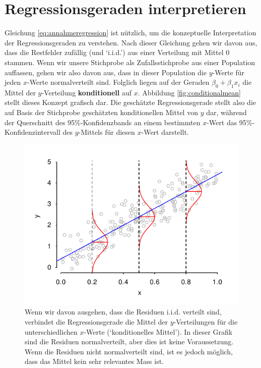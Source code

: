 \documentclass[oneside, 10pt]{book}\usepackage[]{graphicx}\usepackage[]{xcolor}
\newenvironment{knitrout}{}{} %
\begin{document}
\section{Regressionsgeraden interpretieren}\label{sec:regressioninterpretieren}
Gleichung \vref{eq:annahmeregression} ist nützlich, um
die konzeptuelle Interpretation der Regressionsgeraden zu
verstehen.
Nach dieser Gleichung gehen wir davon aus, dass die Restfehler
zufällig (und `i.i.d.') aus einer Verteilung mit Mittel 0 stammen.
Wenn wir unsere Stichprobe als Zufallsstichprobe aus einer Population
auffassen, gehen wir also davon aus, dass in dieser Population
die $y$-Werte für jeden $x$-Werte normalverteilt sind.
Folglich liegen auf der Geraden $\beta_0 + \beta_1 x_i$ die
Mittel der $y$-Verteilung \textbf{konditionell} auf $x$.
Abbildung \ref{fig:conditionalmean} stellt dieses Konzept grafisch dar.
Die geschätzte Regressionsgerade stellt also die auf Basis der
Stichprobe geschätzten konditionellen Mittel von $y$ dar,
während der Querschnitt des 95\%-Konfidenzbands an einem bestimmten
$x$-Wert das 95\%-Konfidenzintervall des $y$-Mittels für diesen $x$-Wert darstellt.

\begin{knitrout}
\color{fgcolor}\begin{figure}[tp]

{\centering \includegraphics[width=.8\textwidth]{figs/unnamed-chunk-227-1} 

}

\caption{Wenn wir davon ausgehen, dass die Residuen i.i.d. verteilt sind, verbindet die Regressionsgerade die Mittel der $y$-Verteilungen für die unterschiedlichen $x$-Werte (`konditionelles Mittel'). In dieser Grafik sind die Residuen normalverteilt, aber dies ist keine Voraussetzung. Wenn die Residuen nicht normalverteilt sind, ist es jedoch möglich, dass das Mittel kein sehr relevantes Mass ist.\label{fig:conditionalmean}}\label{fig:unnamed-chunk-227}
\end{figure}

\end{knitrout}
\end{document}
